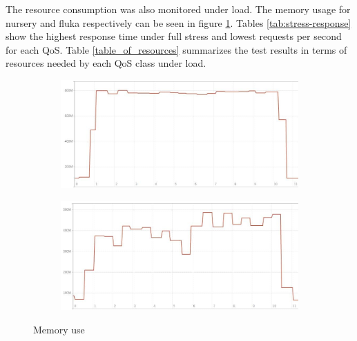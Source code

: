The resource consumption was also monitored under load.
The memory usage for nursery and fluka respectively can be seen in figure \ref{fig:memory}.
Tables \ref{tab:stress-response} show the highest response time under full stress and lowest requests per second for each QoS.
Table \ref{table_of_resources} summarizes the test results in terms of resources needed by each QoS class under load.

\begin{figure}[t]
    \centering
    \begin{subfigure}{0.47\linewidth}
    \centering
    \includegraphics[width=\linewidth]{figures/experiment-figures/nursery_memory_usage.jpg}
    \end{subfigure}
    \hfill
    \begin{subfigure}{0.47\linewidth}
    \includegraphics[width=\linewidth]{figures/experiment-figures/fluka_memory_usage.jpg}
    \end{subfigure}
    \vspace{-1.5em}
    \caption{Memory use}
    \vspace{-1.5em}
    \label{fig:memory}
\end{figure}

